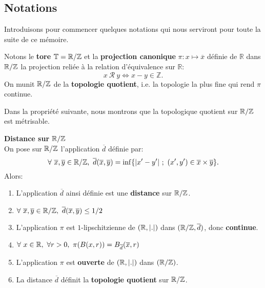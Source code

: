 \subsection{Notations}
Introduisons pour commencer quelques notations qui nous serviront pour toute la suite de ce mémoire.

\begin{notation}
	Notons le \textbf{tore} ${\mathbb{T}}={\mathbb{R}}/\mathbb{Z}$ et la \textbf{projection canonique} $\pi: x \mapsto \overline{x}$ définie de $\mathbb{R}$ dans ${\mathbb{R}}/\mathbb{Z}$ la projection reliée à la relation d'équivalence sur $\mathbb{R}$:
	$$x \ \mathcal{R} \ y \Longleftrightarrow x - y \in \mathbb{Z}.$$
	On munit ${\mathbb{R}}/\mathbb{Z}$ de la \textbf{topologie quotient}, i.e. la topologie la plus fine qui rend $\pi$ continue.
\end{notation}


Dans la propriété suivante, nous montrons que la topologique quotient sur ${\mathbb{R}}/\mathbb{Z}$ est métrisable.


\begin{defippt}\label{distance sur R/Z}\textbf{Distance sur ${\mathbb{R}}/{\mathbb{Z}}$}\\
	On pose sur ${\mathbb{R}}/{\mathbb{Z}}$ l'application $\overline{d}$ définie par:
	$$\forall\ \overline{x}, \overline{y} \in \EnsembleQuotient{\Rbb}{\Zbb},\ \overline{d}(\overline{x},\overline{y})=\inf \lbrace |x'-y'|\ ;\ (x',y')\in \overline{x}\times\overline{y}\rbrace.$$
	Alors:
	\begin{enumerate}
		\item L'application $\overline{d}$ ainsi définie est une \textbf{distance} sur ${\mathbb{R}}/{\mathbb{Z}}$.
		\item $\forall\ \overline{x}, \overline{y} \in \EnsembleQuotient{\Rbb}{\Zbb},\ \overline{d}(\overline{x},\overline{y})\leq 1/2$
		\item L'application $\pi$ est $1$-lipschitzienne de $({\mathbb{R}}, |.|)$ dans $({\mathbb{R}}/{\mathbb{Z}}, \overline{d})$, donc \textbf{continue}.
		\item $\forall\ x \in \Rbb,\ \forall r>0,\ \pi(B(x,r))=B_{\overline{d}}(\overline{x},r)$
		\item L'application $\pi$ est \textbf{ouverte} de $({\mathbb{R}},|.|)$ dans $({\mathbb{R}}/{\mathbb{Z}})$.
		\item La distance $\overline{d}$ définit la \textbf{topologie quotient} sur ${\mathbb{R}}/{\mathbb{Z}}$.
	\end{enumerate}


\end{defippt}


